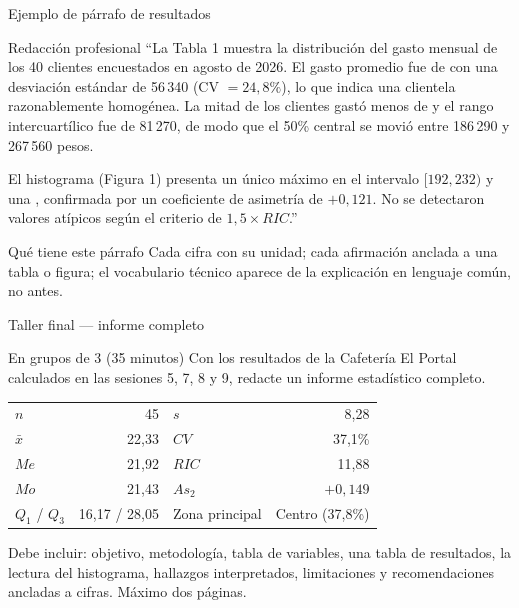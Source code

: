 \documentclass[aspectratio=169,10pt]{beamer}
\begin{document}
\begin{frame}{Ejemplo de párrafo de resultados}
  \begin{exampleblock}{Redacción profesional}
    \scriptsize
    ``La Tabla 1 muestra la distribución del gasto mensual de los 40 clientes
    encuestados en agosto de 2026. El gasto promedio fue de
     con una desviación estándar de 56\,340
    (CV $= 24{,}8\%$), lo que indica una clientela razonablemente
    homogénea. La mitad de los clientes gastó menos de  y el rango intercuartílico fue de 81\,270, de modo que el 50\%
    central se movió entre 186\,290 y 267\,560 pesos.

    \vspace{0.1cm}
    El histograma (Figura 1) presenta un único máximo en el intervalo
    $[192, 232)$ y una , confirmada por un
    coeficiente de asimetría de $+0{,}121$. No se detectaron valores
    atípicos según el criterio de $1{,}5 \times RIC$.''
  \end{exampleblock}

  \vspace{0.1cm}
  \begin{alertblock}{Qué tiene este párrafo}
    \tiny
    Cada cifra con su unidad; cada afirmación anclada a una tabla o figura; el
    vocabulario técnico aparece  de la explicación en
    lenguaje común, no antes.
  \end{alertblock}
\end{frame}

\begin{frame}{Taller final — informe completo}
  \begin{alertblock}{En grupos de 3 (35 minutos)}
    \scriptsize
    Con  los resultados de la Cafetería El Portal calculados en
    las sesiones 5, 7, 8 y 9, redacte un informe estadístico completo.

    \vspace{0.12cm}
    \centering
    \begin{tabular}{@{}lrlr@{}}
      \toprule
      $n$ & 45 & $s$ & 8{,}28 \\
      $\bar{x}$ & 22{,}33 & $CV$ & 37{,}1\% \\
      $Me$ & 21{,}92 & $RIC$ & 11{,}88 \\
      $Mo$ & 21{,}43 & $As_2$ & $+0{,}149$ \\
      $Q_1$ / $Q_3$ & 16{,}17 / 28{,}05 & Zona principal & Centro (37,8\%) \\
      \bottomrule
    \end{tabular}

    \vspace{0.15cm}
    \raggedright
    Debe incluir: objetivo, metodología, tabla de variables, una tabla de
    resultados, la lectura del histograma,  hallazgos
    interpretados,  limitaciones y 
    recomendaciones ancladas a cifras. Máximo dos páginas.
  \end{alertblock}
\end{frame}
\end{document}
